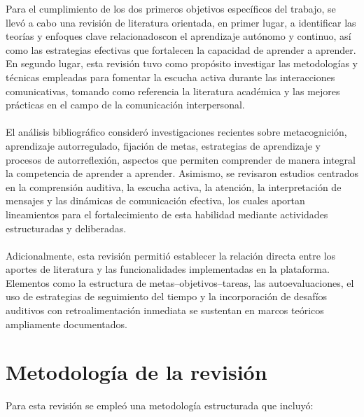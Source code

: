 Para el cumplimiento de los dos primeros objetivos específicos del trabajo, se llevó a cabo una revisión de literatura orientada, en primer lugar, a identificar las teorías y enfoques clave relacionadoscon el aprendizaje autónomo y continuo, así como las estrategias efectivas que fortalecen la capacidad de aprender a aprender. En segundo lugar, esta revisión tuvo como propósito investigar las metodologías y técnicas empleadas para fomentar la escucha activa durante las interacciones comunicativas, tomando como referencia la literatura académica y las mejores prácticas en el campo de la comunicación interpersonal.
\\
\\
El análisis bibliográfico consideró investigaciones recientes sobre metacognición, aprendizaje autorregulado, fijación de metas, estrategias de aprendizaje y procesos de autorreflexión, aspectos que permiten comprender de manera integral la competencia de aprender a aprender. Asimismo, se revisaron estudios centrados en la comprensión auditiva, la escucha activa, la atención, la interpretación de mensajes y las dinámicas de comunicación efectiva, los cuales aportan lineamientos para el fortalecimiento de esta habilidad mediante actividades estructuradas y deliberadas.
\\
\\
Adicionalmente, esta revisión permitió establecer la relación directa entre los aportes de literatura y las funcionalidades implementadas en la plataforma. Elementos como la estructura de metas--objetivos--tareas, las autoevaluaciones, el uso de estrategias de seguimiento del tiempo y la incorporación de desafíos auditivos con retroalimentación inmediata se sustentan en marcos teóricos ampliamente documentados.

\section{Metodología de la revisión}

Para esta revisión se empleó una metodología estructurada que incluyó:

